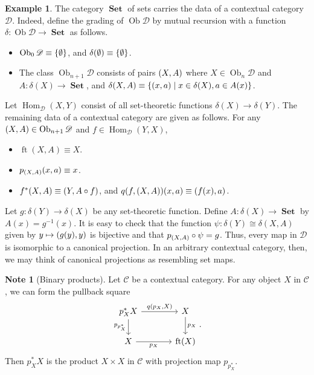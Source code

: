 \documentclass[10pt,letterpaper,cm]{nupset}
\theoremstyle{definition}
\newtheorem{exmp}[definition]{Example}
\newtheorem{note}[definition]{Note}
\theoremstyle{theorem}
\theoremstyle{remark}
\DeclareMathOperator{\ft}{ft}
\DeclareMathOperator{\ob}{Ob}
\newcommand{\0}{\mathbf{0}}
\newcommand{\1}{\mathbf{1}}
\newcommand{\2}{\mathbf{2}}
\DeclareMathOperator{\set}{\mathbf{Set}}
\renewcommand{\c}{\mathscr{C}}
\renewcommand{\d}{\mathscr{D}}
\DeclareMathOperator{\Hom}{Hom}
\newcommand{\bi}{\begin{itemize}}
\newcommand{\ei}{\end{itemize}}
\begin{document}
\begin{exmp}
The category $\set$ of sets carries the data of a contextual category $\d$. Indeed, define the grading of $\ob{\d}$ by mutual recursion with a function $\delta : \ob{\d} \to \set$ as follows.
\bi
\item $\ob_0{\d}\equiv \mleft\{\emptyset\mright\}$, and $\delta(\emptyset)\equiv \mleft\{\emptyset\mright\}$.
\item The class $\ob_{n+1}{\d}$ consists of pairs $\mleft(X,A\mright)$ where $X\in \ob_n{\d}$ and $A: \delta(X)\to \set$, and $\delta(X,A) \equiv \mleft\{\mleft(x,a\mright) \mid x\in \delta(X), a\in A(x)\mright\}$.
\ei
Let $\Hom_{\d}(X, Y)$ consist of all set-theoretic functions $\delta(X) \to \delta(Y)$. The remaining data of a contextual category are given as follows. For any $\mleft(X,A\mright) \in \ob_{n+1}{\d}$ and $f \in \Hom_{\d}(Y,X)$,
\bi
\item $\ft(X, A) \equiv X$.
\item $p_{\mleft(X, A\mright)}(x,a) \equiv x$.
\item $f^{\ast}(X,A) \equiv \mleft(Y, A \circ f\mright)$, and $q(f, \mleft(X, A\mright))(x,a)\equiv \mleft(f(x), a\mright)$.
\ei
Let $g: \delta(Y) \to \delta(X)$ be any set-theoretic function. Define $A: \delta(X) \to \set$ by $A(x) =g^{-1}(x)$. It is easy to check that the function $\psi : \delta(Y) \cong \delta(X,A)$ given by $y \mapsto \mleft(g(y), y\mright)$ is bijective and that $p_{\mleft(X,A\mright)} \circ \psi = g$. Thus, every map in $\d$ is isomorphic to a canonical projection. In an arbitrary contextual category, then, we may think of canonical projections as resembling set maps.
\end{exmp}

\begin{note}[Binary products]
Let $\c$ be a contextual category. For any object $X$ in $\c$, we can form the pullback square 
\[
\begin{tikzcd}[column sep=large]
p_X^{\ast}{X} \arrow[d, "p_{p_X^{\ast}}"'] \arrow[r, "{q(p_X, X)}"] & X \arrow[d, "p_X"] \\
X \arrow[r, "p_X"']                                                 & \ft(X)            
\end{tikzcd}
.\] Then $p_X^{\ast}{X}$ is the product $X\times X$ in $\c$ with projection map $p_{p_X^{\ast}}$.
\end{note}
\end{document}
